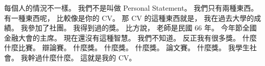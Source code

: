 \hypertarget{c01:cue:2851}{}每個人的情況不一樣。
\hypertarget{c01:cue:2852}{}我們不是叫做 Personal Statement。
\hypertarget{c01:cue:2853}{}我們只有兩種東西。
\hypertarget{c01:cue:2854}{}有一種東西呢，
\hypertarget{c01:cue:2855}{}比較像是你的 CV。
\hypertarget{c01:cue:2856}{}那 CV 的這種東西就是，
\hypertarget{c01:cue:2857}{}我在過去大學的成績。
\hypertarget{c01:cue:2858}{}我參加了社團。
\hypertarget{c01:cue:2859}{}我得到過的獎。
\hypertarget{c01:cue:2860}{}比方說，
\hypertarget{c01:cue:2861}{}老師是民國 66 年。
\hypertarget{c01:cue:2862}{}今年節全國金融大會的主席。
\hypertarget{c01:cue:2863}{}現在還沒有這種智慧。
\hypertarget{c01:cue:2864}{}我們不知道。
\hypertarget{c01:cue:2865}{}反正我有很多獎。
\hypertarget{c01:cue:2866}{}什麼什麼比賽。
\hypertarget{c01:cue:2867}{}辯論賽。
\hypertarget{c01:cue:2868}{}什麼獎。
\hypertarget{c01:cue:2869}{}什麼獎。
\hypertarget{c01:cue:2870}{}什麼獎。
\hypertarget{c01:cue:2871}{}論文賽。
\hypertarget{c01:cue:2872}{}什麼獎。
\hypertarget{c01:cue:2873}{}我學生社會。
\hypertarget{c01:cue:2874}{}我幹過什麼什麼。
\hypertarget{c01:cue:2875}{}這就是我的 CV。

